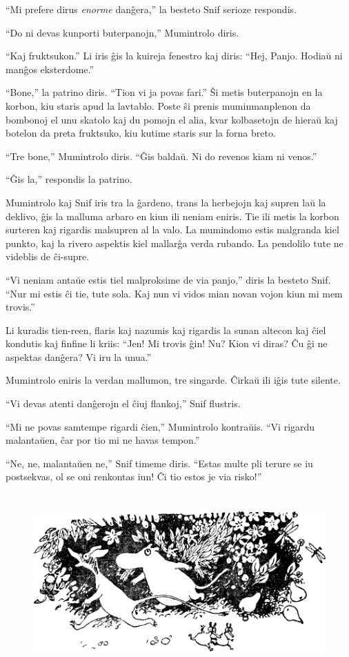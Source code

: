 ``Mi prefere dirus \emph{enorme} danĝera,'' la besteto Snif serioze respondis.

``Do ni devas kunporti buterpanojn,'' Mumintrolo diris.

``Kaj fruktsukon.'' Li iris ĝis la kuireja fenestro kaj diris: ``Hej, Panjo. Hodiaŭ ni manĝos eksterdome.''

``Bone,'' la patrino diris. ``Tion vi ja povas fari.'' Ŝi metis buterpanojn en la korbon, kiu staris apud la lavtablo. Poste ŝi prenis muminmanplenon da bombonoj el unu skatolo kaj du pomojn el alia, kvar kolbasetojn de hieraŭ kaj botelon da preta fruktsuko, kiu kutime staris sur la forna breto.

``Tre bone,'' Mumintrolo diris. ``Ĝis baldaŭ. Ni do revenos kiam ni venos.''

``Ĝis la,'' respondis la patrino.

Mumintrolo kaj Snif iris tra la ĝardeno, trans la herbejojn kaj supren laŭ la deklivo, ĝis la malluma arbaro en kiun ili neniam eniris. Tie ili metis la korbon surteren kaj rigardis malsupren al la valo. La mumindomo estis malgranda kiel punkto, kaj la rivero aspektis kiel mallarĝa verda rubando. La pendolilo tute ne videblis de ĉi-supre.

``Vi neniam antaŭe estis tiel malproksime de via panjo,'' diris la besteto Snif. ``Nur mi estis ĉi tie, tute sola. Kaj nun vi vidos mian novan vojon kiun mi mem trovis.''

Li kuradis tien-reen, flaris kaj nazumis kaj rigardis la sunan altecon kaj ĉiel kondutis kaj finfine li kriis: ``Jen! Mi trovis ĝin! Nu? Kion vi diras? Ĉu ĝi ne aspektas danĝera? Vi iru la unua.''

Mumintrolo eniris la verdan mallumon, tre singarde. Ĉirkaŭ ili iĝis tute silente.

``Vi devas atenti danĝerojn el ĉiuj flankoj,'' Snif flustris.

``Mi ne povas samtempe rigardi ĉien,'' Mumintrolo kontraŭis. ``Vi rigardu malantaŭen, ĉar por tio mi ne havas tempon.''

``Ne, ne, malantaŭen ne,'' Snif timeme diris. ``Estas multe pli terure se iu postsekvas, ol se oni renkontas iun! Ĉi tio estos je via risko!''

\begin{figure}[htbp]
\centering
\includegraphics[width=400pt,height=191pt]{1-3.png}
\caption{}
\label{1-3}
\end{figure}

